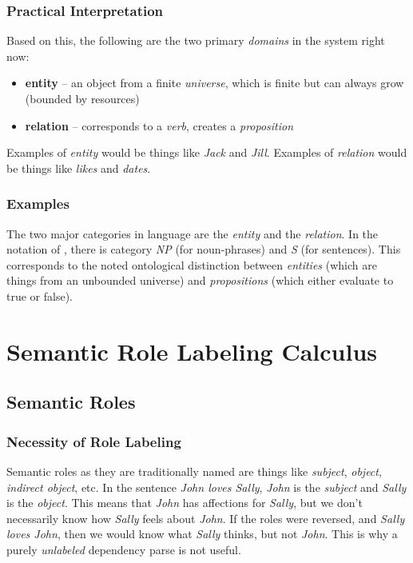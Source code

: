 \documentclass[12pt]{article}
\begin{document}
\subsubsection{Practical Interpretation}
Based on this, the following are the two primary {\em domains} in the system right now:
\begin{itemize}
    \item {\bf entity} -- an object from a finite {\em universe}, which is finite but can always grow (bounded by resources)
    \item {\bf relation} -- corresponds to a {\em verb}, creates a {\em proposition}
\end{itemize}
Examples of {\em entity} would be things like {\em Jack} and {\em Jill}.
Examples of {\em relation} would be things like {\em likes} and {\em dates}.

\subsubsection{Examples}
The two major categories in language are the {\em entity} and the {\em relation}.
In the notation of \cite{steedman2000}, there is category {\em NP} (for noun-phrases) and {\em S} (for sentences).
This corresponds to the noted ontological distinction between {\em entities} (which are things from an unbounded universe) and {\em propositions} (which either evaluate to true or false).



\section{Semantic Role Labeling Calculus}
\subsection{Semantic Roles}
\subsubsection{Necessity of Role Labeling}
Semantic roles as they are traditionally named are things like {\em subject}, {\em object}, {\em indirect object}, etc.
In the sentence {\em John loves Sally}, {\em John} is the {\em subject} and {\em Sally} is the {\em object}.
This means that {\em John} has affections for {\em Sally}, but we don't necessarily know how {\em Sally} feels about {\em John}.
If the roles were reversed, and {\em Sally loves John}, then we would know what {\em Sally} thinks, but not {\em John}.
This is why a purely {\em unlabeled} dependency parse is not useful.
\end{document}
